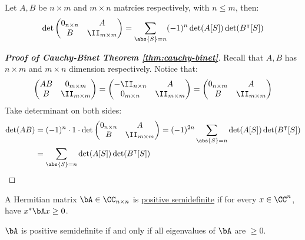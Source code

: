 \begin{corollary}
	Let \( A, B \) be \( n\times m \) and \( m\times n \) matrcies respectively, with \( n\leq m \), then:
	\[
		\det \begin{pmatrix}
			0_{n\times n} & A               \\
			B             & \II_{m\times m}
		\end{pmatrix} = \sum_{\abs{S} = n} (-1)^n \det(A[S]) \det(B^\intercal[S])
	\]
\end{corollary}

\begin{proof}[\textbf{Proof of Cauchy-Binet Theorem \ref{thm:cauchy-binet}}]
	Recall that \( A, B \) has \( n\times m \) and \( m\times n \) dimension respectively. Notice that:
	\[
		\begin{pmatrix}
			AB & 0_{m\times m}   \\
			B  & \II_{m\times m}
		\end{pmatrix} =
		\begin{pmatrix}
			-\II_{n\times n} & A               \\
			0_{m\times n}    & \II_{m\times m}
		\end{pmatrix} =
		\begin{pmatrix}
			0_{n\times m} & A               \\
			B             & \II_{m\times m}
		\end{pmatrix}
	\]
	Take determinant on both sides:
	\[
		\begin{aligned}
			\det(AB) & = (-1)^n \cdot 1 \cdot \det
			\begin{pmatrix}
				0_{n\times n} & A               \\
				B             & \II_{m\times m}
			\end{pmatrix} = (-1)^{2n} \sum_{\abs{S} = n }\det(A[S]) \det(B^\intercal [S]) \\
			         & = \sum_{\abs{S} = n} \det(A[S]) \det(B^\intercal [S])
		\end{aligned}
	\]
\end{proof}

\begin{definition}
	A Hermitian matrix \( \bA \in \CC_{n\times n} \) is \underline{positive semidefinite} if for every
	\( x \in \CC^n \), have \( x^* \bA x \geq 0 \).
\end{definition}

\begin{theorem}
	\( \bA \) is positive semidefinite if and only if all eigenvalues of \( \bA \) are \( \geq 0 \).
\end{theorem}


